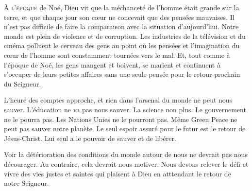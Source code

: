 



\lettrine{À}{ l'époque} de Noé, Dieu vit que la méchanceté de l'homme
 était grande sur la terre, et que chaque jour son c\oe{}ur ne concevait
 que des pensées mauvaises. Il n'est pas difficile de faire
 la comparaison avec la situation d'aujourd'hui. Notre monde est plein
 de violence et de corruption. Les industries de la télévision
 et du cinéma polluent le cerveau des gens au point où les pensées
 et l'imagination du c\oe{}ur de l'homme sont constamment
 tournées vers le mal. Et, tout comme à l'époque de Noé,
 les gens mangent et boivent, se marient et continuent
 à s'occuper de leurs petites affaires sans une seule pensée
 pour le retour prochain du Seigneur. 


L'heure des comptes approche, et rien dans l'arsenal du monde
 ne peut nous sauver. L'éducation ne va pas nous sauver.
 La science non plus. Le gouvernement ne le pourra pas.
 Les Nations Unies ne le pourront pas. Même Green Peace
 ne peut pas sauver notre planète. Le seul espoir assuré pour le futur
 est le retour de Jésus-Christ.
 Lui seul a le pouvoir de sauver et de libérer. 

Voir la détérioration des conditions du monde autour de nous
 ne devrait pas nous décourager. Au contraire, cela devrait nous motiver.
 Nous devons relever le défi et vivre des vies justes et saintes
 qui plaisent à Dieu en atttendant le retour de notre Seigneur. 

\dvrule




